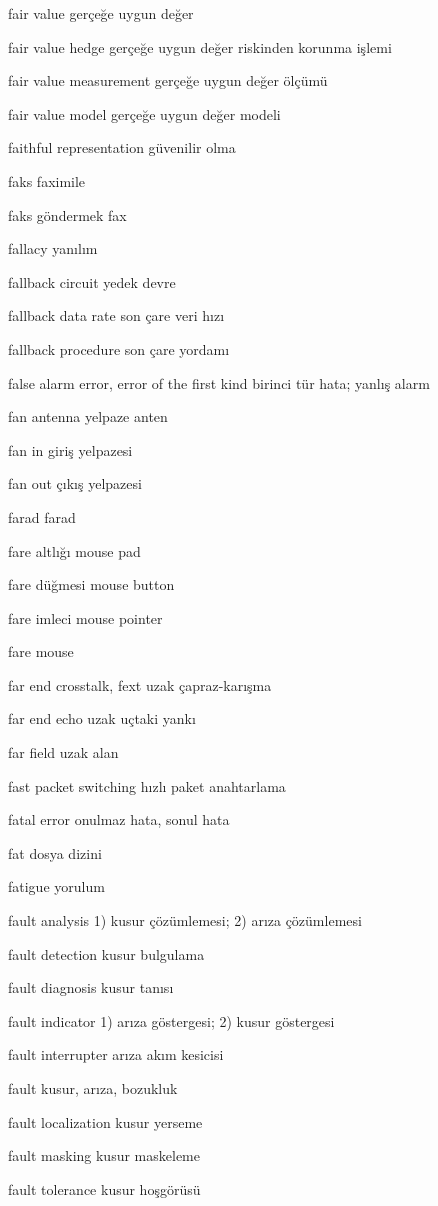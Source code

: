\documentclass[12pt,fleqn]{article}\usepackage{../../common}
\begin{document}
fair value gerçeğe uygun değer

fair value hedge gerçeğe uygun değer riskinden korunma işlemi

fair value measurement gerçeğe uygun değer ölçümü

fair value model gerçeğe uygun değer modeli

faithful representation güvenilir olma

faks faximile

faks göndermek fax

fallacy yanılım

fallback circuit yedek devre

fallback data rate son çare veri hızı

fallback procedure son çare yordamı

false alarm error, error of the first kind birinci tür hata; yanlış alarm

fan antenna yelpaze anten

fan in giriş yelpazesi

fan out çıkış yelpazesi

farad farad

fare altlığı mouse pad

fare düğmesi mouse button

fare imleci mouse pointer

fare mouse

far end crosstalk, fext uzak çapraz-karışma

far end echo uzak uçtaki yankı

far field uzak alan

fast packet switching hızlı paket anahtarlama

fatal error onulmaz hata, sonul hata

fat dosya dizini

fatigue yorulum

fault analysis 1) kusur çözümlemesi; 2) arıza çözümlemesi

fault detection kusur bulgulama

fault diagnosis kusur tanısı

fault indicator 1) arıza göstergesi; 2) kusur göstergesi

fault interrupter arıza akım kesicisi

fault kusur, arıza, bozukluk

fault localization kusur yerseme

fault masking kusur maskeleme

fault tolerance kusur hoşgörüsü
\end{document}
